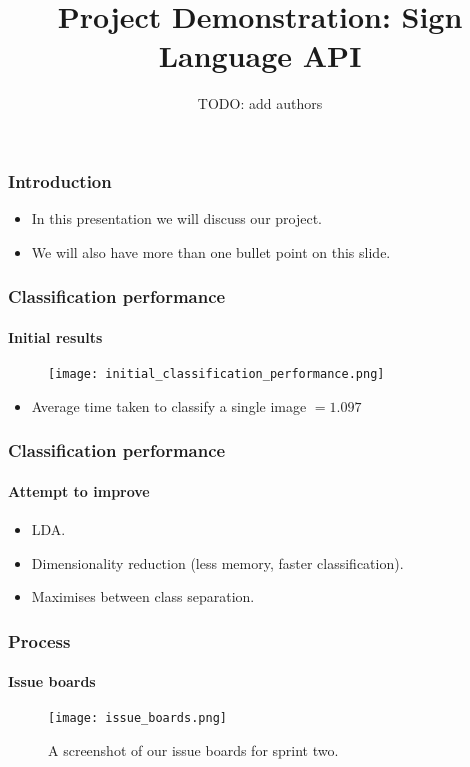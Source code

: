 \documentclass{beamer}
\title{Project Demonstration: Sign Language API}
\author{TODO: add authors}
\date{}
\begin{document}
\begin{frame}[t]
	\titlepage
\end{frame}

\begin{frame}[t]
	\frametitle{Introduction}
	\begin{itemize}
		\item In this presentation we will discuss our project.
		\item We will also have more than one bullet point on this slide.
	\end{itemize}
\end{frame}

\begin{frame}[t]
	\frametitle{Classification performance}
	\framesubtitle{Initial results}
	\begin{figure}
		\texttt{[image: initial\_classification\_performance.png]}
	\end{figure}
	\begin{itemize}
		\item Average time taken to classify a single image $= 1.097$
	\end{itemize}
	
\end{frame}

\begin{frame}[t]
	\frametitle{Classification performance}
	\framesubtitle{Attempt to improve}
	\begin{itemize}
		\item LDA.
		\item Dimensionality reduction (less memory, faster classification).
		\item Maximises between class separation.
	\end{itemize}
\end{frame}

\begin{frame}[t]
	\frametitle{Process}
	\framesubtitle{Issue boards}
	\begin{figure}
		\texttt{[image: issue\_boards.png]}
		\caption{A screenshot of our issue boards for sprint two.}
	\end{figure}
\end{frame}
\end{document}
